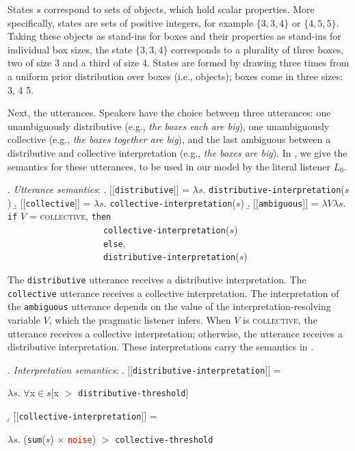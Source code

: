 \documentclass[linguex]{sp}
\newcommand{\sem}[1]{\mbox{$[\![$#1$]\!]$}}
\newcommand{\lam}{$\lambda$}
\begin{document}
 States $s$ correspond to sets of objects, which hold scalar properties. More specifically, states are sets of positive integers, for example $\{3, 3, 4\}$ or $\{4, 5, 5\}$. Taking these objects as stand-ins for boxes and their properties as stand-ins for individual box sizes, the state $\{3, 3, 4\}$ corresponds to a plurality of three boxes, two of size 3 and a third of size 4. States are formed by drawing three times from a uniform prior distribution over boxes (i.e., objects); boxes come in three sizes: 3, 4 5.
 
 Next, the utterances. Speakers have the choice between three utterances: one {unambiguously distributive} (e.g., \emph{the boxes each are big}), one {unambiguously collective} (e.g., \emph{the boxes together are big}), and the last {ambiguous} between a distributive and collective interpretation (e.g., \emph{the boxes are big}). In \Next, we give the semantics for these utterances, to be used in our model by the literal listener $L_{0}$.
 
 \ex. \emph{Utterance semantics}:
 \a. \sem{\texttt{distributive}} = \lam $s$. \texttt{distributive-interpretation}($s$)
 \b. \sem{\texttt{collective}} = \lam $s$. \texttt{collective-interpretation}($s$)
 \b. \sem{\texttt{ambiguous}} = \lam $V$\lam $s$. \texttt{if} $V$ = \textsc{collective}, \texttt{then}\\  \textcolor{white}{\sem{\texttt{ambiguous}} = \lam $V$\lam $s$. }\texttt{collective-interpretation}($s$)\\
 \textcolor{white}{\sem{\texttt{ambiguous}} = \lam $V$\lam $s$. }\texttt{else}, \\
 \textcolor{white}{\sem{\texttt{ambiguous}} = \lam $V$\lam $s$. }\texttt{distributive-interpretation}($s$)
 
 The \texttt{distributive} utterance receives a distributive interpretation. The \texttt{collective} utterance receives a collective interpretation. The interpretation of the \texttt{ambiguous} utterance depends on the value of the interpretation-resolving variable $V$, which the pragmatic listener infers. When $V$ is \textsc{collective}, the utterance receives a collective interpretation; otherwise, the utterance receives a distributive interpretation. These interpretations carry the semantics in \Next.
 
 \ex. \emph{Interpretation semantics}:
 \a. \sem{\texttt{distributive-interpretation}} =
\begin{flushright}\lam $s$. $\forall$x$\in$$s$[x $>$ \texttt{distributive-threshold}]\end{flushright}
\b. \sem{\texttt{collective-interpretation}} = 
\begin{flushright}\lam $s$. (\texttt{sum}($s$) $\times$ \textcolor{red}{\texttt{noise}}) $>$ \texttt{collective-threshold}\end{flushright}
\end{document}
